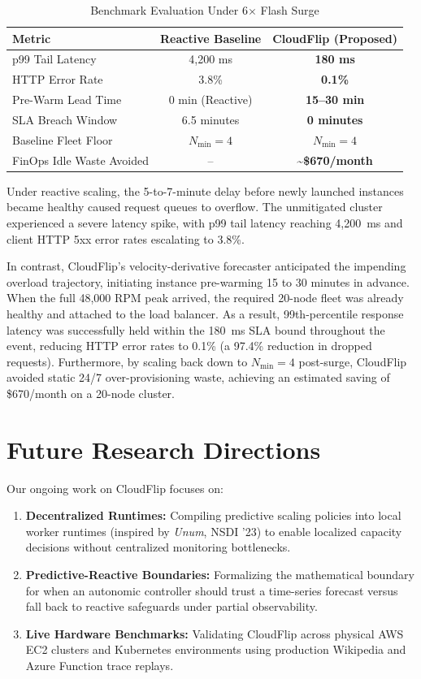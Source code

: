 \documentclass[conference]{IEEEtran}
\begin{document}
\begin{table}[h]
\caption{Benchmark Evaluation Under 6$\times$ Flash Surge}
\label{tab:evaluation}
\centering
\begin{tabular}{lcc}
\toprule
\textbf{Metric} & \textbf{Reactive Baseline} & \textbf{CloudFlip (Proposed)} \\
\midrule
p99 Tail Latency & 4,200 ms & \textbf{180 ms} \\
HTTP Error Rate & 3.8\% & \textbf{0.1\%} \\
Pre-Warm Lead Time & 0 min (Reactive) & \textbf{15--30 min} \\
SLA Breach Window & 6.5 minutes & \textbf{0 minutes} \\
Baseline Fleet Floor & $N_{\min} = 4$ & $N_{\min} = 4$ \\
FinOps Idle Waste Avoided & -- & \textbf{\~{}\$670/month} \\
\bottomrule
\end{tabular}
\end{table}

Under reactive scaling, the 5-to-7-minute delay before newly launched instances became healthy caused request queues to overflow. The unmitigated cluster experienced a severe latency spike, with p99 tail latency reaching 4,200~ms and client HTTP 5xx error rates escalating to 3.8\%.

In contrast, CloudFlip's velocity-derivative forecaster anticipated the impending overload trajectory, initiating instance pre-warming 15 to 30 minutes in advance. When the full 48,000 RPM peak arrived, the required 20-node fleet was already healthy and attached to the load balancer. As a result, 99th-percentile response latency was successfully held within the 180~ms SLA bound throughout the event, reducing HTTP error rates to 0.1\% (a 97.4\% reduction in dropped requests). Furthermore, by scaling back down to $N_{\min} = 4$ post-surge, CloudFlip avoided static 24/7 over-provisioning waste, achieving an estimated saving of \$670/month on a 20-node cluster.

\section{Future Research Directions}
Our ongoing work on CloudFlip focuses on:
\begin{enumerate}
    \item \textbf{Decentralized Runtimes:} Compiling predictive scaling policies into local worker runtimes (inspired by \textit{Unum}, NSDI '23) to enable localized capacity decisions without centralized monitoring bottlenecks.
    \item \textbf{Predictive-Reactive Boundaries:} Formalizing the mathematical boundary for when an autonomic controller should trust a time-series forecast versus fall back to reactive safeguards under partial observability.
    \item \textbf{Live Hardware Benchmarks:} Validating CloudFlip across physical AWS EC2 clusters and Kubernetes environments using production Wikipedia and Azure Function trace replays.
\end{enumerate}
\end{document}
